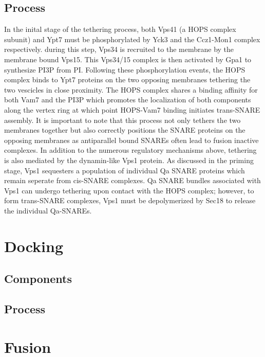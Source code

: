 \documentclass[12pt,twoside]{reedthesis}
\begin{document}
\subsection{Process}\label{process-1}

In the inital stage of the tethering process, both Vps41 (a HOPS complex subunit) and Ypt7 must be phosphorylated by Yck3 and the Ccz1-Mon1 complex respectively. during this step, Vps34 is recruited to the membrane by the membrane bound Vps15. This Vps34/15 complex is then activated by Gpa1 to synthesize PI3P from PI. Following these phosphorylation events, the HOPS complex binds to Ypt7 proteins on the two opposing membranes tethering the two vescicles in close proximity. The HOPS complex shares a binding affinity for both Vam7 and the PI3P which promotes the localization of both components along the vertex ring at which point HOPS-Vam7 binding initiates trans-SNARE assembly. It is important to note that this process not only tethers the two membranes together but also correctly positions the SNARE proteins on the opposing membranes as antiparallel bound SNAREs often lead to fusion inactive complexes. In addition to the numerous regulatory mechanisms above, tethering is also mediated by the dynamin-like Vps1 protein. As discussed in the priming stage, Vps1 sequesters a population of individual Qa SNARE proteins which remain seperate from cis-SNARE complexes. Qa SNARE bundles associated with Vps1 can undergo tethering upon contact with the HOPS complex; however, to form trans-SNARE complexes, Vps1 must be depolymerized by Sec18 to release the individual Qa-SNAREs.

\section{Docking}\label{docking}

\subsection{Components}\label{components-2}

\subsection{Process}\label{process-2}

\section{Fusion}\label{fusion}
\end{document}

